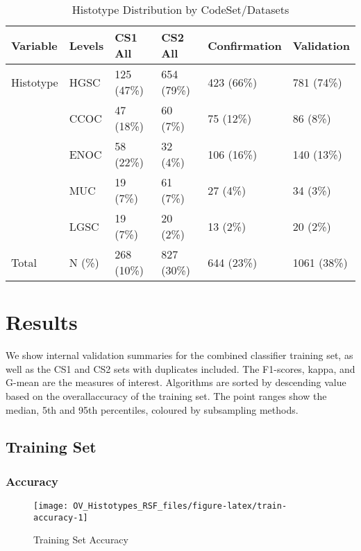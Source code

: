 \documentclass[
]{report}
\begin{document}
\begin{table}

\caption{\label{tab:hist-codeset-dataset}Histotype Distribution by CodeSet/Datasets}
\centering
\begin{tabular}[t]{l|l|l|l|l|l}
\hline
Variable & Levels & CS1 All & CS2 All & Confirmation & Validation\\
\hline
Histotype & HGSC & 125 (47\%) & 654 (79\%) & 423 (66\%) & 781 (74\%)\\
\hline
 & CCOC & 47 (18\%) & 60 (7\%) & 75 (12\%) & 86 (8\%)\\
\hline
 & ENOC & 58 (22\%) & 32 (4\%) & 106 (16\%) & 140 (13\%)\\
\hline
 & MUC & 19 (7\%) & 61 (7\%) & 27 (4\%) & 34 (3\%)\\
\hline
 & LGSC & 19 (7\%) & 20 (2\%) & 13 (2\%) & 20 (2\%)\\
\hline
Total & N (\%) & 268 (10\%) & 827 (30\%) & 644 (23\%) & 1061 (38\%)\\
\hline
\end{tabular}
\end{table}

\hypertarget{results}{%
\chapter{Results}\label{results}}

We show internal validation summaries for the combined classifier training set, as well as the CS1 and CS2 sets with duplicates included. The F1-scores, kappa, and G-mean are the measures of interest. Algorithms are sorted by descending value based on the overallaccuracy of the training set. The point ranges show the median, 5th and 95th percentiles, coloured by subsampling methods.

\hypertarget{training-set-1}{%
\section{Training Set}\label{training-set-1}}

\hypertarget{accuracy}{%
\subsection{Accuracy}\label{accuracy}}

\begin{figure}[H]

{\centering \texttt{[image: OV\_Histotypes\_RSF\_files/figure-latex/train-accuracy-1]} 

}

\caption{Training Set Accuracy}\label{fig:train-accuracy}
\end{figure}
\end{document}
